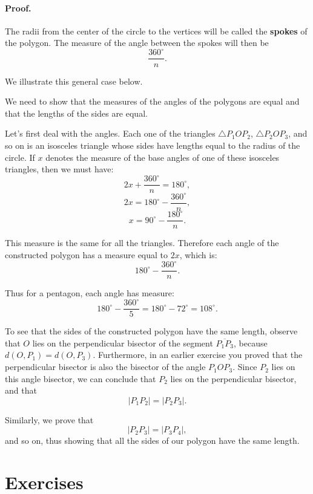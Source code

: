 \documentclass[12pt]{book} %
\begin{document}

\paragraph{Proof.}
The radii from the center of the circle to the vertices will be called the \textbf{spokes} of the polygon. The measure of the angle between the spokes will then be
\[
\frac{360^\circ}{n}.
\]

We illustrate this general case below.


We need to show that the measures of the angles of the polygons are equal and that the lengths of the sides are equal.

Let's first deal with the angles. Each one of the triangles $\triangle P_1OP_2$, $\triangle P_2OP_3$, and so on is an isosceles triangle whose sides have lengths equal to the radius of the circle. If $x$ denotes the measure of the base angles of one of these isosceles triangles, then we must have:
\[
2x+\frac{360^\circ}{n}=180^\circ,
\]
\[
2x=180^\circ-\frac{360^\circ}{n},
\]
\[
x=90^\circ-\frac{180^\circ}{n}.
\]

This measure is the same for all the triangles. Therefore each angle of the constructed polygon has a measure equal to $2x$, which is:
\[
180^\circ-\frac{360^\circ}{n}.
\]

Thus for a pentagon, each angle has measure:
\[
180^\circ-\frac{360^\circ}{5}=180^\circ-72^\circ=108^\circ.
\]

To see that the sides of the constructed polygon have the same length, observe that $O$ lies on the perpendicular bisector of the segment $\overline{P_1P_3}$, because $d(O,P_1)=d(O,P_3)$. Furthermore, in an earlier exercise you proved that the perpendicular bisector is also the bisector of the angle $P_1OP_3$. Since $P_2$ lies on this angle bisector, we can conclude that $P_2$ lies on the perpendicular bisector, and that
\[
|P_1P_2|=|P_2P_3|.
\]

Similarly, we prove that
\[
|P_2P_3|=|P_3P_4|,
\]
and so on, thus showing that all the sides of our polygon have the same length.

\section*{Exercises}
\end{document}
